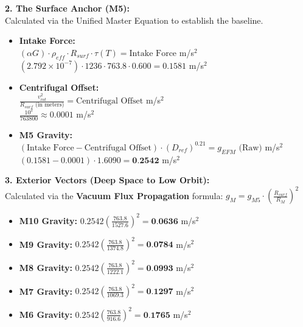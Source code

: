 \documentclass[11pt, a4paper]{article}
\begin{document}
  \vspace{1.0em}
  \noindent \textbf{2. The Surface Anchor (M5):} \\
  \hspace*{1em} Calculated via the Unified Master Equation to establish the baseline.
  \begin{itemize}
    \item \textbf{Intake Force:} \\[0.5em]
    \hspace*{2em} $(\alpha G) \cdot \rho_{eff} \cdot R_{surf} \cdot \tau(T) = \text{Intake Force}$ m/s$^2$ \\[1em]
    \hspace*{2em} $(2.792 \times 10^{-7}) \cdot 1236 \cdot 763.8 \cdot 0.600 = 0.1581$ m/s$^2$
    
    \item \textbf{Centrifugal Offset:} \\[0.5em]
    \hspace*{2em} $\frac{v_{rot}^2}{R_{surf} \text{ (in meters)}} = \text{Centrifugal Offset}$ m/s$^2$ \\[1em]
    \hspace*{2em} $\frac{10^2}{763800} \approx 0.0001$ m/s$^2$
    
    \item \textbf{M5 Gravity:} \\[0.5em]
    \hspace*{2em} $(\text{Intake Force} - \text{Centrifugal Offset}) \cdot (D_{ref})^{0.21} = g_{EFM} \text{ (Raw)}$ m/s$^2$ \\[1em]
    \hspace*{2em} $(0.1581 - 0.0001) \cdot 1.6090 = \textbf{0.2542}$ m/s$^2$
  \end{itemize}

  \clearpage
  \noindent \textbf{3. Exterior Vectors (Deep Space to Low Orbit):} \\
  \hspace*{1em} Calculated via the \textbf{Vacuum Flux Propagation} formula: $g_M = g_{M5} \cdot \left( \frac{R_{surf}}{R_M} \right)^2$
  \begin{itemize}
    \item \textbf{M10 Gravity:} $0.2542 \left( \frac{763.8}{1527.6} \right)^2 = \textbf{0.0636}$ m/s$^2$
    \item \textbf{M9 Gravity:} $0.2542 \left( \frac{763.8}{1374.8} \right)^2 = \textbf{0.0784}$ m/s$^2$
    \item \textbf{M8 Gravity:} $0.2542 \left( \frac{763.8}{1222.1} \right)^2 = \textbf{0.0993}$ m/s$^2$
    \item \textbf{M7 Gravity:} $0.2542 \left( \frac{763.8}{1069.3} \right)^2 = \textbf{0.1297}$ m/s$^2$
    \item \textbf{M6 Gravity:} $0.2542 \left( \frac{763.8}{916.6} \right)^2 = \textbf{0.1765}$ m/s$^2$
  \end{itemize}
\end{document}
